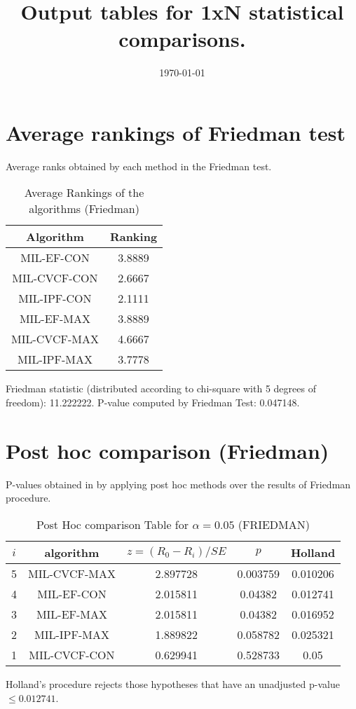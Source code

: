 \documentclass[a4paper,10pt]{article}
\title{Output tables for 1xN statistical comparisons.}
\author{}
\date{\today}
\begin{document}
\begin{landscape}
\pagestyle{empty}
\maketitle
\thispagestyle{empty}

\section{Average rankings of Friedman test}


Average ranks obtained by each method in the Friedman test.

\begin{table}[!htp]
\centering
\begin{tabular}{|c|c|}\hline
Algorithm&Ranking\\\hline
MIL-EF-CON&3.8889\\MIL-CVCF-CON&2.6667\\MIL-IPF-CON&2.1111\\MIL-EF-MAX&3.8889\\MIL-CVCF-MAX&4.6667\\MIL-IPF-MAX&3.7778\\\hline\end{tabular}
\caption{Average Rankings of the algorithms (Friedman)}
\end{table}

Friedman statistic (distributed according to chi-square with 5 degrees of freedom): 11.222222. \newline P-value computed by Friedman Test: 0.047148.\newline


\newpage

\section{Post hoc comparison (Friedman)}


P-values obtained in by applying post hoc methods over the results of Friedman procedure.

\begin{table}[!htp]
\centering\footnotesize
\begin{tabular}{ccccc}
$i$&algorithm&$z=(R_0 - R_i)/SE$&$p$&Holland\\
\hline5&MIL-CVCF-MAX&2.897728&0.003759&0.010206\\4&MIL-EF-CON&2.015811&0.04382&0.012741\\3&MIL-EF-MAX&2.015811&0.04382&0.016952\\2&MIL-IPF-MAX&1.889822&0.058782&0.025321\\1&MIL-CVCF-CON&0.629941&0.528733&0.05\\\hline
\end{tabular}
\caption{Post Hoc comparison Table for $\alpha=0.05$ (FRIEDMAN)}
\end{table}Holland's procedure rejects those hypotheses that have an unadjusted p-value $\le0.012741$.



\end{landscape}
\end{document}
